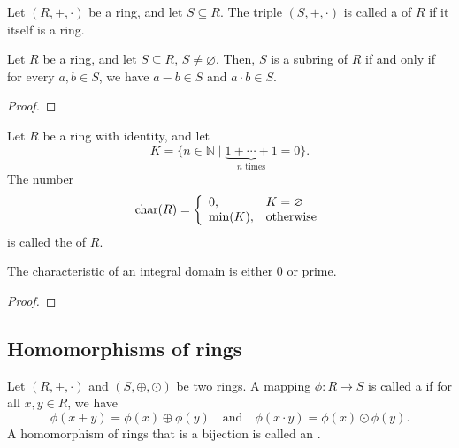 \begin{defn}
Let $ (R,+,\cdot) $ be a ring, and let $ S\subseteq R $. The triple $ (S,+,\cdot) $ is called a  of $ R $ if it itself is a ring.
\end{defn}

\begin{thm}
Let $ R $ be a ring, and let $ S\subseteq R $, $ S\neq\varnothing $. Then, $ S $ is a subring of $ R $ if and only if for every $ a,b\in S $, we have $ a-b\in S $ and $ a\cdot b\in S $.
\end{thm}
\begin{proof}
\end{proof}

\begin{defn}
Let $ R $ be a ring with identity, and let
\begin{equation*}
    K=\{n\in\mathbb{N}\mid\underbrace{1+\cdots+1}_{n\text{ times}}=0\}.
\end{equation*}
The number
\begin{equation*}
    \operatorname{char}(R)=
    \left\{\begin{array}{ll}
        0, & K=\varnothing \\
        \min(K), & \text{otherwise}
    \end{array}\right.
\end{equation*}
is called the  of $ R $.
\end{defn}

\begin{prop}
The characteristic of an integral domain is either $ 0 $ or prime.
\end{prop}
\begin{proof}
\end{proof}

\subsection*{Homomorphisms of rings}

\begin{defn}
Let $ (R,+,\cdot) $ and $ (S,\oplus,\odot) $ be two rings. A mapping $ \phi:R\to S $ is called a  if for all $ x,y\in R $, we have
\begin{equation*}
    \phi(x+y)=\phi(x)\oplus\phi(y) \quad\text{and}\quad \phi(x\cdot y)=\phi(x)\odot\phi(y).
\end{equation*}
A homomorphism of rings that is a bijection is called an .
\end{defn}

